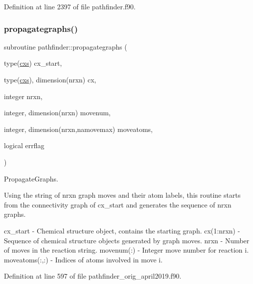 Definition at line 2397 of file pathfinder.\+f90.

\mbox{\label{namespacepathfinder_adda000dd8f8436b118c46aa8e3205413}} 
\subsubsection{\texorpdfstring{propagategraphs()}{propagategraphs()}\hspace{0.1cm}{\footnotesize\ttfamily [2/2]}}
{\footnotesize\ttfamily subroutine pathfinder\+::propagategraphs (\begin{DoxyParamCaption}\item[{type(\mbox{\hyperlink{structchemstr_1_1cxs}{cxs}})}]{cx\+\_\+start,  }\item[{type(\mbox{\hyperlink{structchemstr_1_1cxs}{cxs}}), dimension(nrxn)}]{cx,  }\item[{integer}]{nrxn,  }\item[{integer, dimension(nrxn)}]{movenum,  }\item[{integer, dimension(nrxn,namovemax)}]{moveatoms,  }\item[{logical}]{errflag }\end{DoxyParamCaption})}



Propagate\+Graphs. 

Using the string of nrxn graph moves and their atom labels, this routine starts from the connectivity graph of cx\+\_\+start and generates the sequence of nrxn graphs.

cx\+\_\+start -\/ Chemical structure object, contains the starting graph. cx(1\+:nrxn) -\/ Sequence of chemical structure objects generated by graph moves. nrxn -\/ Number of moves in the reaction string. movenum(\+:) -\/ Integer move number for reaction i. moveatoms(\+:,\+:) -\/ Indices of atoms involved in move i. 

Definition at line 597 of file pathfinder\+\_\+orig\+\_\+april2019.\+f90.

\mbox{\label{namespacepathfinder_a52341df0a1b5efe1b1f65b263667a6b2}} 
